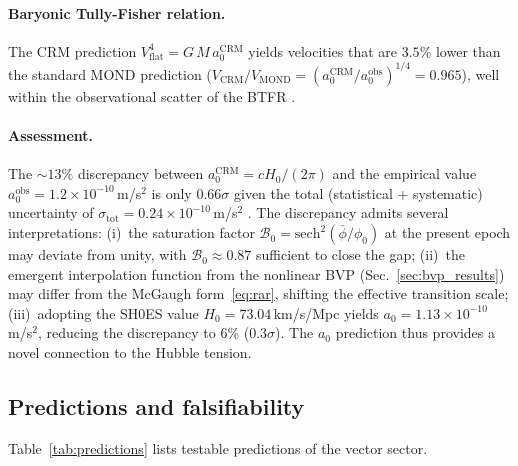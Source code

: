\documentclass[aps,prd,twocolumn,superscriptaddress,nofootinbib]{revtex4-2}
\begin{document}
\paragraph{Baryonic Tully-Fisher relation.}
The CRM prediction $V_{\mathrm{flat}}^4 = G\,M\,a_0^{\mathrm{CRM}}$ yields velocities that are $3.5\%$ lower than the standard MOND prediction ($V_{\mathrm{CRM}}/V_{\mathrm{MOND}} = (a_0^{\mathrm{CRM}}/a_0^{\mathrm{obs}})^{1/4} = 0.965$), well within the observational scatter of the BTFR \cite{McGaugh2012}.

\paragraph{Assessment.}
The $\sim 13\%$ discrepancy between $a_0^{\mathrm{CRM}} = cH_0/(2\pi)$ and the empirical value $a_0^{\mathrm{obs}} = 1.2 \times 10^{-10}$\,m/s$^2$ is only $0.66\sigma$ given the total (statistical + systematic) uncertainty of $\sigma_{\mathrm{tot}} = 0.24 \times 10^{-10}$\,m/s$^2$ \cite{McGaugh2016}. The discrepancy admits several interpretations: (i)~the saturation factor $\mathcal{B}_0 = \mathrm{sech}^2(\bar{\phi}/\phi_0)$ at the present epoch may deviate from unity, with $\mathcal{B}_0 \approx 0.87$ sufficient to close the gap; (ii)~the emergent interpolation function from the nonlinear BVP (Sec.~\ref{sec:bvp_results}) may differ from the McGaugh form~\eqref{eq:rar}, shifting the effective transition scale; (iii)~adopting the SH0ES value $H_0 = 73.04$\,km/s/Mpc \cite{Riess2022} yields $a_0 = 1.13 \times 10^{-10}$\,m/s$^2$, reducing the discrepancy to $6\%$ ($0.3\sigma$). The $a_0$ prediction thus provides a novel connection to the Hubble tension.

\subsection{Predictions and falsifiability}

Table~\ref{tab:predictions} lists testable predictions of the vector sector.
\end{document}
